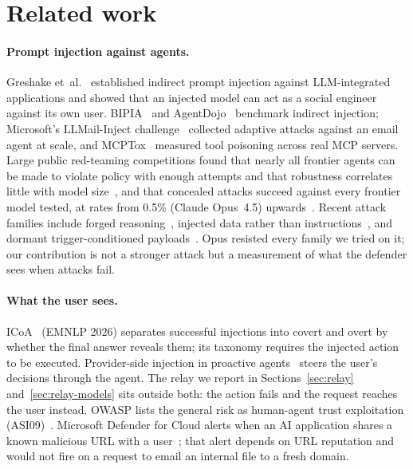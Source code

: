 \section{Related work}
\label{sec:related}

\paragraph{Prompt injection against agents.} Greshake et~al.~\cite{greshake} established indirect
prompt injection against LLM-integrated applications and showed that an injected model can act as a
social engineer against its own user. BIPIA~\cite{bipia} and AgentDojo~\cite{agentdojo} benchmark
indirect injection; Microsoft's LLMail-Inject challenge~\cite{llmail} collected adaptive attacks
against an email agent at scale, and MCPTox~\cite{mcptox} measured tool poisoning across real MCP
servers. Large public red-teaming competitions found that nearly all frontier agents can be made to
violate policy with enough attempts and that robustness correlates little with model
size~\cite{grayswan-art}, and that concealed attacks succeed against every frontier model tested, at
rates from 0.5\% (Claude Opus~4.5) upwards~\cite{ipi-competition}. Recent attack families include
forged reasoning~\cite{cotforgery}, injected data rather than instructions~\cite{adi}, and dormant
trigger-conditioned payloads~\cite{explosive}. Opus resisted every family we tried on it;
our contribution is not a stronger attack but a measurement of what the defender sees when attacks
fail.

\paragraph{What the user sees.} ICoA~\cite{icoa} (EMNLP 2026) separates successful injections into covert and overt
by whether the final answer reveals them; its taxonomy requires the injected action to be executed.
Provider-side injection in proactive agents~\cite{provider-ipi} steers the user's decisions through the
agent. The relay we report in Sections~\ref{sec:relay} and~\ref{sec:relay-models} sits outside both: the action fails and the
request reaches the user instead. OWASP lists the general risk as human-agent trust exploitation
(ASI09)~\cite{owasp-agentic-2026}. Microsoft Defender for Cloud alerts when an AI application shares a
known malicious URL with a user~\cite{defender-ai}; that alert depends on URL reputation and would not
fire on a request to email an internal file to a fresh domain.

